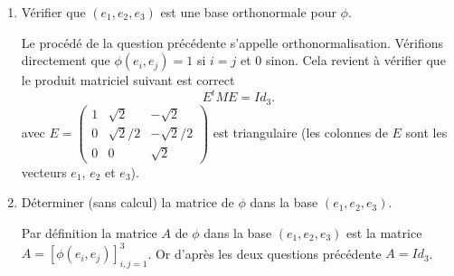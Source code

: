 \documentclass[a4paper]{tp_um}
\begin{document}
\begin{enumerate}
\begin{itemize}
\end{itemize}

	\item Vérifier que $(e_1,e_2,e_3)$ est une base orthonormale pour $\phi$.

\bigskip

Le procédé de la question précédente s'appelle orthonormalisation. Vérifions directement que $\phi(e_i,e_j) = 1$ si $i=j$ et $0$ sinon.  Cela revient à vérifier que le produit matriciel suivant est correct
\[
	E^t M E = Id_3.
\]
avec $E = \begin{pmatrix}
	1 & \sqrt 2 & - \sqrt 2 \\ 0 & \sqrt 2 /2 & -\sqrt 2 /2 \\ 0 & 0 & \sqrt 2 
\end{pmatrix}$ est triangulaire (les colonnes de $E$ sont les vecteurs $e_1$, $e_2$ et $e_3$).

\bigskip
	\item Déterminer (sans calcul) la matrice de $\phi$ dans la base $(e_1,e_2,e_3)$.

\bigskip
		Par définition la matrice $A$ de $\phi$ dans la base $(e_1,e_2,e_3)$ est la matrice $A = [ \phi(e_i,e_j) ]_{i,j=1}^3$. Or d'après les deux questions précédente $A = Id_3$.

\end{enumerate}
\end{document}
